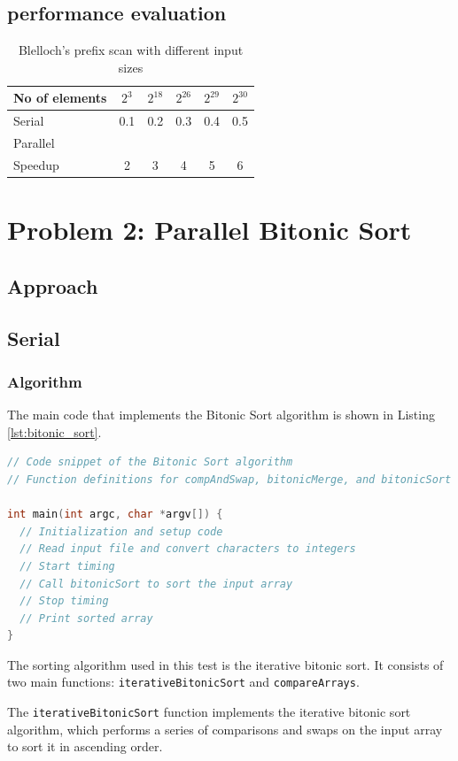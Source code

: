 \subsection{performance evaluation}
\begin{table}[htb]
	\centering
	\caption{Blelloch's prefix scan with different input sizes}\label{tab:example}
	\begin{tabular}{l|ccccc}
		\toprule
		No of elements& $2^3$ & $2^{18}$ & $2^{26}$ & $2^{29}$ & $2^{30}$\\
		\midrule
		Serial &0.1&0.2&0.3&0.4&0.5\\
		Parallel &&&&\\
		Speedup &2&3&4&5&6\\
		\bottomrule
	\end{tabular}
\end{table}
\pagebreak
\section{Problem 2: Parallel Bitonic Sort}
\subsection*{Approach}
\subsection{Serial} 
\subsubsection{Algorithm}
The main code that implements the Bitonic Sort algorithm is shown in Listing \ref{lst:bitonic_sort}.

\begin{lstlisting}[language=C, caption={Bitonic Sort Algorithm}, label={lst:bitonic_sort}]
// Code snippet of the Bitonic Sort algorithm
// Function definitions for compAndSwap, bitonicMerge, and bitonicSort

int main(int argc, char *argv[]) {
  // Initialization and setup code
  // Read input file and convert characters to integers
  // Start timing
  // Call bitonicSort to sort the input array
  // Stop timing
  // Print sorted array
}
\end{lstlisting}

The sorting algorithm used in this test is the iterative bitonic sort. It consists of two main functions: \texttt{iterativeBitonicSort} and \texttt{compareArrays}.

The \texttt{iterativeBitonicSort} function implements the iterative bitonic sort algorithm, which performs a series of comparisons and swaps on the input array to sort it in ascending order.

